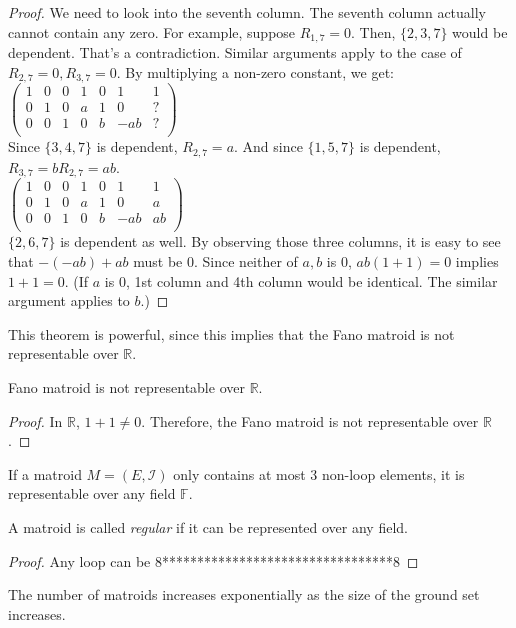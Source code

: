 \begin{proof}
We need to look into the seventh column.
The seventh column actually cannot contain any zero.
For example, suppose $R_{1, 7} = 0$.
Then, $\{2, 3, 7 \}$ would be dependent.
That's a contradiction.
Similar arguments apply to the case of $R_{2, 7} = 0, R_{3, 7} = 0$.
By multiplying a non-zero constant, we get:\\
$\begin{pmatrix}
1 & 0 & 0 & 1 & 0 & 1 & 1 \\
0 & 1 & 0 & a & 1 & 0 & ? \\
0 & 0 & 1 & 0 & b & -ab & ? \\
\end{pmatrix}$\\
Since $\{3, 4, 7\}$ is dependent, $R_{2, 7} = a$.
And since $\{1, 5, 7\}$ is dependent, $R_{3, 7} = b R_{2, 7} = ab$.\\
$\begin{pmatrix}
1 & 0 & 0 & 1 & 0 & 1 & 1 \\
0 & 1 & 0 & a & 1 & 0 & a \\
0 & 0 & 1 & 0 & b & -ab & ab \\
\end{pmatrix}$\\
$\{ 2, 6, 7 \}$ is dependent as well.
By observing those three columns, it is easy to see that $-(-ab) + ab$ must be 0.
Since neither of $a, b$ is 0, $ab(1 + 1) = 0$ implies $1 + 1 = 0$.
(If $a$ is 0, 1st column and 4th column would be identical. The similar argument applies to $b$.)
\end{proof}

This theorem is powerful, since this implies that the Fano matroid is not representable over $\mathbb{R}$.

\begin{cor}
Fano matroid is not representable over $\mathbb{R}$.
\end{cor}

\begin{proof}
In $\mathbb{R}$, $1 + 1 \neq 0$. Therefore, the Fano matroid is not representable over $\mathbb{R}$.
\end{proof}


\begin{thm}
If a matroid $M = (E, \mathcal{I})$ only contains at most 3 non-loop elements, it is representable over any field $\mathbb{F}$.
\end{thm}

A matroid is called \textit{regular} if it can be represented over any field.

\begin{proof}
Any loop can be 8*********************************8
\end{proof}

The number of matroids increases exponentially as the size of the ground set increases.

